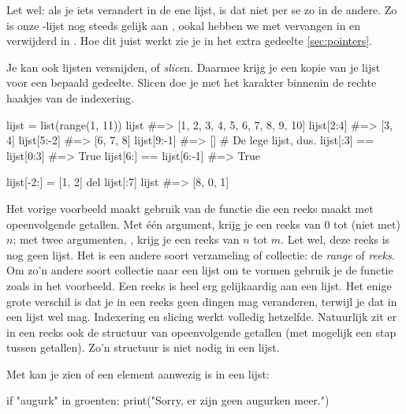   Let wel: als je iets verandert in de ene lijst, is dat niet per se zo in de
  andere. Zo is onze -lijst nog steeds gelijk aan , ookal hebben we
   met  vervangen in  en
   verwijderd in . Hoe dit juist werkt zie je in het
  extra gedeelte \ref{sec:pointers}.

  Je kan ook lijsten versnijden, of \emph{slice}n. Daarmee krijg je een kopie
  van je lijst voor een bepaald gedeelte. Slicen doe je met het karakter \py{:}
  binnenin de rechte haakjes van de indexering.
  \begin{python}
    lijst = list(range(1, 11))
    lijst            #=> [1, 2, 3, 4, 5, 6, 7, 8, 9, 10]
    lijst[2:4]       #=> [3, 4]
    lijst[5:-2]      #=> [6, 7, 8]
    lijst[9:-1]      #=> []  # De lege lijst, dus.
    lijst[:3] == lijst[0:3]  #=> True
    lijst[6:] == lijst[6:-1] #=> True

    lijst[-2:] = [1, 2]
    del lijst[:7]
    lijst            #=> [8, 0, 1]
  \end{python}
  Het vorige voorbeeld maakt gebruik van de functie  die een reeks
  maakt met opeenvolgende getallen. Met \'e\'en argument,  krijg je
  een reeks van $0$ tot (niet met) $n$; met twee argumenten, ,
  krijg je een reeks van $n$ tot $m$. Let wel, deze reeks is nog geen lijst. Het
  is een andere soort verzameling of collectie: de \emph{range} of \emph{reeks}.
  Om zo'n andere soort collectie naar een lijst om te vormen gebruik je de
  functie  zoals in het voorbeeld. Een reeks is heel erg gelijkaardig
  aan een lijst. Het enige grote verschil is dat je in een reeks geen dingen mag
  veranderen, terwijl je dat in een lijst wel mag. Indexering en slicing werkt
  volledig hetzelfde. Natuurlijk zit er in een reeks ook de structuur van
  opeenvolgende getallen (met mogelijk een stap tussen getallen). Zo'n structuur
  is niet nodig in een lijst.

  Met  kan je zien of een element aanwezig is in een lijst:
  \begin{python}
    if "augurk" in groenten:
      print("Sorry, er zijn geen augurken meer.")
  \end{python}

